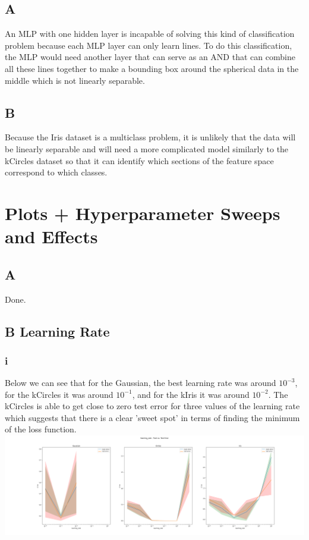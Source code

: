 \documentclass{article}
\begin{document}
\subsection{A}
An MLP with one hidden layer is incapable of solving this kind of classification problem because each MLP layer can only learn lines. To do this classification, the MLP would need another layer that can serve as an AND that can combine all these lines together to make a bounding box around the spherical data in the middle which is not linearly separable.
\subsection{B}
Because the Iris dataset is a multiclass problem, it is unlikely that the data will be linearly separable and will need a more complicated model similarly to the kCircles dataset so that it can identify which sections of the feature space correspond to which classes. 

\newpage
\section{Plots + Hyperparameter Sweeps and Effects}
\subsection{A}
Done.
\subsection{B Learning Rate}
\subsubsection{i}
Below we can see that for the Gaussian, the best learning rate was around $10^{-3}$, for the kCircles it was around $10^{-1}$, and for the kIris it was around $10^{-2}$. The kCircles is able to get close to zero test error for three values of the learning rate which suggests that there is a clear 'sweet spot' in terms of finding the minimum of the loss function. \\
\includegraphics*[width=18cm]{learning_rate}
\end{document}
